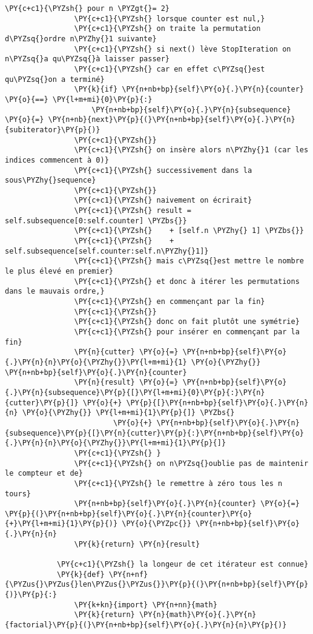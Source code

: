 \begin{Verbatim}[commandchars=\\\{\},frame=single,framerule=0.3mm,rulecolor=\color{cellframecolor}]
                \PY{c+c1}{\PYZsh{} pour n \PYZgt{}= 2}
                \PY{c+c1}{\PYZsh{} lorsque counter est nul,}
                \PY{c+c1}{\PYZsh{} on traite la permutation d\PYZsq{}ordre n\PYZhy{}1 suivante}
                \PY{c+c1}{\PYZsh{} si next() lève StopIteration on n\PYZsq{}a qu\PYZsq{}à laisser passer}
                \PY{c+c1}{\PYZsh{} car en effet c\PYZsq{}est qu\PYZsq{}on a terminé}
                \PY{k}{if} \PY{n+nb+bp}{self}\PY{o}{.}\PY{n}{counter} \PY{o}{==} \PY{l+m+mi}{0}\PY{p}{:}
                    \PY{n+nb+bp}{self}\PY{o}{.}\PY{n}{subsequence} \PY{o}{=} \PY{n+nb}{next}\PY{p}{(}\PY{n+nb+bp}{self}\PY{o}{.}\PY{n}{subiterator}\PY{p}{)}
                \PY{c+c1}{\PYZsh{}}
                \PY{c+c1}{\PYZsh{} on insère alors n\PYZhy{}1 (car les indices commencent à 0)}
                \PY{c+c1}{\PYZsh{} successivement dans la sous\PYZhy{}sequence}
                \PY{c+c1}{\PYZsh{}}
                \PY{c+c1}{\PYZsh{} naivement on écrirait}
                \PY{c+c1}{\PYZsh{} result = self.subsequence[0:self.counter] \PYZbs{}}
                \PY{c+c1}{\PYZsh{}    + [self.n \PYZhy{} 1] \PYZbs{}}
                \PY{c+c1}{\PYZsh{}    + self.subsequence[self.counter:self.n\PYZhy{}1]}
                \PY{c+c1}{\PYZsh{} mais c\PYZsq{}est mettre le nombre le plus élevé en premier}
                \PY{c+c1}{\PYZsh{} et donc à itérer les permutations dans le mauvais ordre,}
                \PY{c+c1}{\PYZsh{} en commençant par la fin}
                \PY{c+c1}{\PYZsh{}}
                \PY{c+c1}{\PYZsh{} donc on fait plutôt une symétrie}
                \PY{c+c1}{\PYZsh{} pour insérer en commençant par la fin}
                \PY{n}{cutter} \PY{o}{=} \PY{n+nb+bp}{self}\PY{o}{.}\PY{n}{n}\PY{o}{\PYZhy{}}\PY{l+m+mi}{1} \PY{o}{\PYZhy{}} \PY{n+nb+bp}{self}\PY{o}{.}\PY{n}{counter}
                \PY{n}{result} \PY{o}{=} \PY{n+nb+bp}{self}\PY{o}{.}\PY{n}{subsequence}\PY{p}{[}\PY{l+m+mi}{0}\PY{p}{:}\PY{n}{cutter}\PY{p}{]} \PY{o}{+} \PY{p}{[}\PY{n+nb+bp}{self}\PY{o}{.}\PY{n}{n} \PY{o}{\PYZhy{}} \PY{l+m+mi}{1}\PY{p}{]} \PYZbs{}
                         \PY{o}{+} \PY{n+nb+bp}{self}\PY{o}{.}\PY{n}{subsequence}\PY{p}{[}\PY{n}{cutter}\PY{p}{:}\PY{n+nb+bp}{self}\PY{o}{.}\PY{n}{n}\PY{o}{\PYZhy{}}\PY{l+m+mi}{1}\PY{p}{]}
                \PY{c+c1}{\PYZsh{} }
                \PY{c+c1}{\PYZsh{} on n\PYZsq{}oublie pas de maintenir le compteur et de}
                \PY{c+c1}{\PYZsh{} le remettre à zéro tous les n tours}
                \PY{n+nb+bp}{self}\PY{o}{.}\PY{n}{counter} \PY{o}{=} \PY{p}{(}\PY{n+nb+bp}{self}\PY{o}{.}\PY{n}{counter}\PY{o}{+}\PY{l+m+mi}{1}\PY{p}{)} \PY{o}{\PYZpc{}} \PY{n+nb+bp}{self}\PY{o}{.}\PY{n}{n}
                \PY{k}{return} \PY{n}{result}
        
            \PY{c+c1}{\PYZsh{} la longeur de cet itérateur est connue}
            \PY{k}{def} \PY{n+nf}{\PYZus{}\PYZus{}len\PYZus{}\PYZus{}}\PY{p}{(}\PY{n+nb+bp}{self}\PY{p}{)}\PY{p}{:}
                \PY{k+kn}{import} \PY{n+nn}{math}
                \PY{k}{return} \PY{n}{math}\PY{o}{.}\PY{n}{factorial}\PY{p}{(}\PY{n+nb+bp}{self}\PY{o}{.}\PY{n}{n}\PY{p}{)}
\end{Verbatim}


